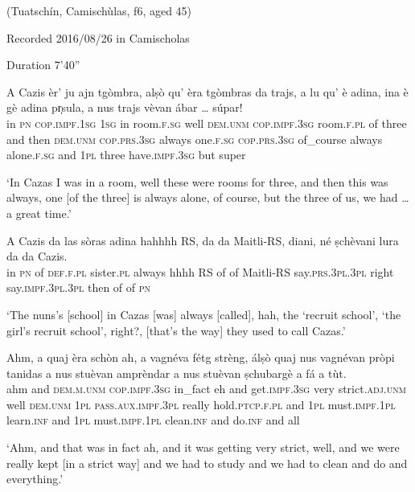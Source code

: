 \noindent
(Tuatschín, Camischùlas, f6, aged 45)

\noindent
Recorded 2016/08/26 in Camischolas 

\noindent
Duration 7'40''

\bigskip

\begin{linenumbers}
\gll    A Cazis èr’ ju ajn tgòmbra, alṣò qu’ èra tgòmbras da trajs, a lu qu’ è adina, ina è gè adina pr̩sula, a nus trajs vèvan ábar … súpar!\\
in \textsc{pn} \textsc{cop.impf.1sg}	\textsc{1sg} in room.\textsc{f.sg} well \textsc{dem.unm} \textsc{cop.impf.3sg} room.\textsc{f.pl} of three and then \textsc{dem.unm} \textsc{cop.prs.3sg} always  one.\textsc{f.sg} \textsc{cop.prs.3sg} of\_course always alone.\textsc{f.sg} and \textsc{1pl} three have.\textsc{impf.3sg} but {} super\\
\end{linenumbers}
\medskip
\glt `In Cazas I was in a room, well these were rooms for three, and then this was always, one [of the three] is always alone, of course, but the three of us, we had … a great time.'
\medskip

\begin{linenumbers}
\gll    A Cazis da las sòras adina hahhhh RS, da da Maitli-RS, diani, né ṣchèvani lura da da Cazis.\\
in \textsc{pn} of \textsc{def.f.pl} sister.\textsc{pl} always hhhh RS of of Maitli-RS\footnotemark{} say.\textsc{prs.3pl.3pl} right say.\textsc{impf.3pl.3pl} then of of \textsc{pn}\\
\end{linenumbers}
\medskip
{} 
\glt `The nuns’s [school] in Cazas [was] always [called], hah, the ‘recruit school’, ‘the girl’s recruit school’, right?, [that’s the way] they used to call Cazas.'
\medskip

\begin{linenumbers}
\gll    Ahm, a quaj èra schòn ah, a vagnéva fétg strèng, álṣò quaj nus vagnévan pròpi tanidas a nus stuèvan amprèndar a nus stuèvan ṣchubargè a fá a tùt.\\
ahm and \textsc{dem.m.unm} \textsc{cop.impf.3sg} in\_fact eh and get.\textsc{impf.3sg} very strict.\textsc{adj.unm} well \textsc{dem.unm} \textsc{1pl} \textsc{pass.aux.impf.3pl} really hold.\textsc{ptcp.f.pl} and \textsc{1pl} must.\textsc{impf.1pl} learn.\textsc{inf} and \textsc{1pl}  must.\textsc{impf.1pl} clean.\textsc{inf} and do.\textsc{inf} and all\\
\end{linenumbers}
\medskip
\glt `Ahm, and that was in fact ah, and it was getting very strict, well, and we were really kept [in a strict way] and we had to study and we had to clean and do and everything.'
\medskip

